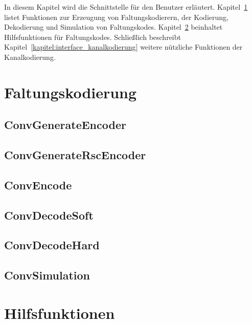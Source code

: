 
In diesem Kapitel wird die Schnittstelle für den Benutzer erläutert. Kapitel~\ref{kapitel:interface_faltungskodierung} listet Funktionen zur Erzeugung von Faltungskodierern, der Kodierung, Dekodierung und Simulation von Faltungskodes. Kapitel~\ref{kapitel:interface_hilfsfunktionen} beinhaltet Hilfsfunktionen für Faltungskodes. Schließlich beschreibt Kapitel~\ref{kapitel:interface_kanalkodierung} weitere nützliche Funktionen der Kanalkodierung.

\section{Faltungskodierung}
\label{kapitel:interface_faltungskodierung}

\subsection{ConvGenerateEncoder}


\subsection{ConvGenerateRscEncoder}


\subsection{ConvEncode}


\subsection{ConvDecodeSoft}


\subsection{ConvDecodeHard}


\subsection{ConvSimulation}


\section{Hilfsfunktionen}
\label{kapitel:interface_hilfsfunktionen}

